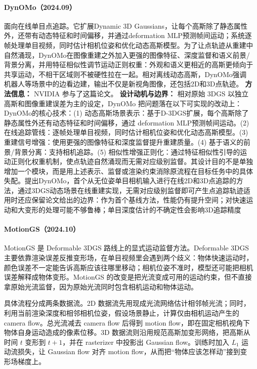 \paragraph{DynOMo（2024.09）\cite{2409_02104}}
面向在线单目点追踪。它扩展Dynamic 3D Gaussians，让每个高斯除了静态属性外，还带有动态特征和时间偏移，并通过deformation MLP预测帧间运动；系统逐帧处理单目视频，同时估计相机位姿和优化动态高斯模型。为了让点轨迹从重建中自然涌现，DynOMo在图像重建之外加入更强的图像特征、深度监督和语义前景/背景分离，并用特征相似性调节运动正则权重：外观和语义更相近的高斯更倾向于共享运动，不相干区域则不被硬性拉在一起。相对离线动态高斯，DynOMo强调机器人等场景中的边看边建，输出不仅是新视角图像，还包括2D和3D点轨迹。
\textbf{方法信息：} NVIDIA 参与了这篇论文。
\textbf{设计动机与边界：} 相对原始 3DGS 以独立高斯和图像重建误差为主的设定，DynOMo 把问题落在以下可实现的改动上：DynOMo的核心技术：(1) 动态高斯场景表示：基于D-3DGS扩展，每个高斯除了静态属性外还有动态特征和时间偏移，通过 deformation MLP预测帧间运动。(2) 在线追踪管线：逐帧处理单目视频，同时估计相机位姿和优化动态高斯模型。(3) 重建信号增强：使用更强的图像特征和深度监督提升重建质量。(4) 基于语义的前景/背景分离：支持相机追踪。(5) 相似性增强正则化：通过特征相似性引导的运动正则化权重机制，使点轨迹自然涌现而无需对应级别监督。其设计目的不是单独增加一个模块，而是用上述表示、监督或渲染约束消除原流程在目标任务中的具体失配。提出DynOMo，首个从无位姿单目相机输入进行在线2D和3D点追踪的方法，通过3DGS动态场景在线重建实现，无需对应级别监督即可产生点追踪轨迹适用时还应保留论文给出的边界：作为首个基线方法，性能仍有提升空间；对快速运动和大变形的处理可能不够鲁棒；单目深度估计的不确定性会影响3D追踪精度
\paragraph{MotionGS（2024.10）\cite{2410_07707}}
MotionGS 是 Deformable 3DGS 路线上的显式运动监督方法。Deformable 3DGS 主要依靠渲染误差反推变形场，在单目视频里会遇到两个歧义：物体快速运动时，颜色误差不一定能告诉高斯应该往哪里移动；相机位姿不准时，模型还可能把相机误差解释成物体变形。MotionGS 的改变是把光流变成可用的运动约束，但不直接拿原始光流监督，因为原始光流同时包含相机运动和物体运动。

具体流程分成两条数据流。2D 数据流先用现成光流网络估计相邻帧光流；同时，利用当前渲染深度和相邻相机位姿，假设场景静止，计算仅由相机运动产生的 camera flow。总光流减去 camera flow 后得到 motion flow，即在固定相机视角下物体自身运动造成的像素位移。3D 数据流则沿用规范高斯加变形网络，把高斯从时间 $t$ 变形到 $t+1$，并在 rasterizer 中投影出 Gaussian flow。训练时加入 $L_1$ 运动流损失，让 Gaussian flow 对齐 motion flow，从而把“物体应该怎样动”接到变形场梯度上。

